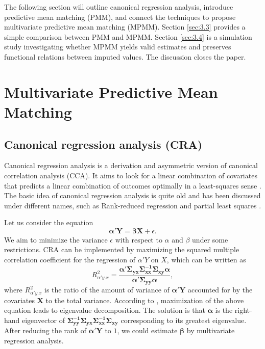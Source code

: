 	
	
	The following section will outline canonical regression analysis, introduce predictive mean matching (PMM), and connect the techniques to propose multivariate predictive mean matching (MPMM). Section \ref{sec:3.3} provides a simple comparison between PMM and MPMM. Section \ref{sec:3.4} is a simulation study investigating whether MPMM yields valid estimates and preserves functional relations between imputed values. The discussion closes the paper.
	
	
	
	
	
	\section{Multivariate Predictive Mean Matching}
	\label{sec:3.2}
	\subsection{Canonical regression analysis (CRA)}
	Canonical regression analysis is a derivation and asymmetric version of canonical correlation analysis (CCA). It aims to look for a linear combination of covariates that predicts a linear combination of outcomes optimally in a least-squares sense \citep{Israels1987}. The basic idea of canonical regression analysis is quite old and has been discussed under different names, such as Rank-reduced regression \citep{izenman1975reduced} and partial least squares \citep{sun2009equivalence}.  
	
	Let us consider the equation
	\begin{equation}
		\boldsymbol{\alpha'Y} = \boldsymbol{\beta X} + \epsilon.
	\end{equation}
	We aim to minimize the variance $\epsilon$ with respect to $\alpha$ and $\beta$ under some restrictions. CRA can be implemented by maximizing the squared multiple correlation coefficient for the regression of $\alpha'Y$ on $X$, which can be written as
	\begin{equation}
		R^2_{\alpha'y.x}=\frac{\boldsymbol{\alpha'\Sigma_{yx}\Sigma^{-1}_{xx}\Sigma_{xy}\alpha}}{\boldsymbol{\alpha'\Sigma_{yy}\alpha}},
	\end{equation}
	where $R^2_{\alpha'y.x}$ is the ratio of the amount of variance of $\boldsymbol{\alpha'Y}$ accounted for by the covariates $\boldsymbol{X}$ to the total variance. According to \citet{McDonald1968}, maximization of the above equation leads to eigenvalue decomposition. The solution is that $\boldsymbol{\alpha}$ is the right-hand eigenvector of $\boldsymbol{\Sigma^{-1}_{yy}\Sigma_{yx}\Sigma^{-1}_{xx}\Sigma_{xy}}$ corresponding to its greatest eigenvalue. After reducing the rank of $\boldsymbol{\alpha'Y}$ to $1$, we could estimate $\boldsymbol{\beta}$ by multivariate regression analysis. 
	
